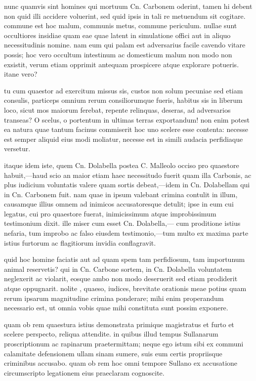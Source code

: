  nunc quamvis sint homines qui mortuum Cn. Carbonem oderint, tamen hi debent non quid illi accidere voluerint, sed quid ipsis in tali re metuendum sit cogitare. commune est hoc malum, communis metus, commune periculum. nullae sunt occultiores insidiae quam eae quae latent in simulatione offici aut in aliquo necessitudinis nomine. nam eum qui palam est adversarius facile cavendo vitare possis; hoc vero occultum intestinum ac domesticum malum non modo non exsistit, verum etiam opprimit antequam prospicere atque explorare potueris. itane vero?

 tu cum quaestor ad exercitum missus sis, custos non solum pecuniae sed etiam consulis, particeps omnium rerum consiliorumque fueris, habitus sis in liberum loco, sicut mos maiorum ferebat, repente relinquas, deseras, ad adversarios transeas? O scelus, o portentum in ultimas terras exportandum! non enim potest ea natura quae tantum facinus commiserit hoc uno scelere esse contenta: necesse est semper aliquid eius modi moliatur, necesse est in simili audacia perfidiaque versetur.

 itaque idem iste, quem Cn. Dolabella postea C. Malleolo occiso pro quaestore habuit,—haud scio an maior etiam haec necessitudo fuerit quam illa Carbonis, ac plus iudicium voluntatis valere quam sortis debeat,—idem in Cn. Dolabellam qui in Cn. Carbonem fuit. nam quae in ipsum valebant crimina contulit in illum, causamque illius omnem ad inimicos accusatoresque detulit; ipse in eum cui legatus, cui pro quaestore fuerat, inimicissimum atque improbissimum testimonium dixit. ille miser cum esset Cn. Dolabella,— cum proditione istius nefaria, tum improbo ac falso eiusdem testimonio,—tum multo ex maxima parte istius furtorum ac flagitiorum invidia conflagravit.

 quid hoc homine faciatis aut ad quam spem tam perfidiosum, tam importunum animal reservetis? qui in Cn. Carbone sortem, in Cn. Dolabella voluntatem neglexerit ac violarit, eosque ambo non modo deseruerit sed etiam prodiderit atque oppugnarit. nolite , quaeso, iudices, brevitate orationis meae potius quam rerum ipsarum magnitudine crimina ponderare; mihi enim properandum necessario est, ut omnia vobis quae mihi constituta sunt possim exponere.

 quam ob rem quaestura istius demonstrata primique magistratus et furto et scelere perspecto, reliqua attendite. in quibus illud tempus Sullanarum proscriptionum ac rapinarum praetermittam; neque ego istum sibi ex communi calamitate defensionem ullam sinam sumere, suis eum certis propriisque criminibus accusabo. quam ob rem hoc omni tempore Sullano ex accusatione circumscripto legationem eius praeclaram cognoscite.

